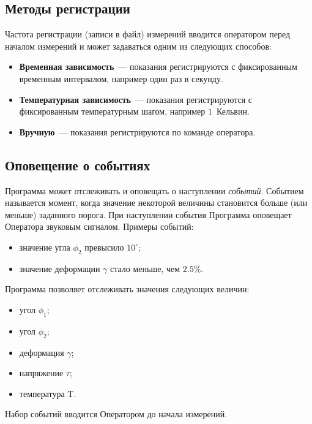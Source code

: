 \documentclass[12pt, a4paper, twocolumn]{report}
\begin{document}
\subsection{Методы регистрации}

\label{sec_registration_types}

Частота регистрации (записи в файл) измерений вводится оператором перед началом измерений и может задаваться одним из следующих способов:

\begin{itemize}
\item {\bf Временная зависимость}~--- показания регистрируются с фиксированным временным интервалом, например один раз в секунду.
\item {\bf Температурная зависимость}~--- показания регистрируются с фиксированным температурным шагом, например $1$~Кельвин.
\item \label{sec_reg_type_manual} {\bf Вручную}~--- показания регистрируются по команде оператора.
\end{itemize}

\subsection{Оповещение о событиях}
\label{sec_events}

Программа может отслеживать и оповещать о наступлении {\it событий}. Событием называется момент, когда значение некоторой величины становится больше (или меньше) заданного порога. При наступлении события Программа оповещает Оператора звуковым сигналом. Примеры событий:

\begin{itemize}
\item значение угла $\phi_2$ превысило $10^{\circ}$;
\item значение деформации $\gamma$ стало меньше, чем $2.5\%$.
\end{itemize}

Программа позволяет отслеживать значения следующих величин:

\begin{itemize}
\item угол $\phi_1$;
\item угол $\phi_2$;
\item деформация $\gamma$;
\item напряжение $\tau$;
\item температура T.
\end{itemize}

Набор событий вводится Оператором до начала измерений.
\end{document}
